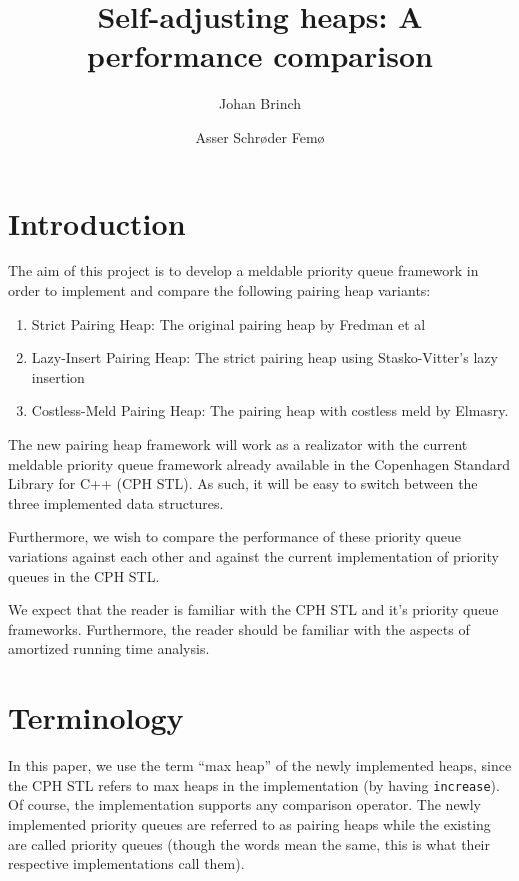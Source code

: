 \documentclass{DIKU-article}[2010/01/13]
\title{Self-adjusting heaps: A performance comparison}
\author{
Johan Brinch
\and
Asser Schrøder Femø
}
\institute{
Department of Computing, University of Copenhagen\\
Universitetsparken 1, DK-2100 Copenhagen East, Denmark\\
\email{zerrez@diku.dk}
\and
\email{asser@diku.dk}
}
\newcommand{\code}[1]{{\small\texttt{#1}}}
\begin{document}
\maketitle

\begin{abstract}
\end{abstract}

\begin{subject}
\end{subject}

\section{Introduction}

The aim of this project is to develop a meldable priority queue
framework in order to implement and compare the following pairing heap
variants:

\begin{enumerate}
\item Strict Pairing Heap: The original pairing heap by Fredman et
  al\cite{fredman}
\item Lazy-Insert Pairing Heap: The strict pairing heap using
  Stasko-Vitter's lazy insertion\cite{stasky}
\item Costless-Meld Pairing Heap: The pairing heap with costless meld
  by Elmasry\cite{elmasry}.
\end{enumerate}

The new pairing heap framework will work as a realizator with the
current meldable priority queue framework already available in the
Copenhagen Standard Library for C++ (CPH STL). As such, it will be
easy to switch between the three implemented data structures.

Furthermore, we wish to compare the performance of these priority
queue variations against each other and against the current
implementation of priority queues in the CPH STL.

We expect that the reader is familiar with the CPH STL and it's
priority queue frameworks\cite{cphstl-framework}. Furthermore, the
reader should be familiar with the aspects of amortized running time
analysis.



\section{Terminology}
In this paper, we use the term "`max heap"' of the newly implemented
heaps, since the CPH STL refers to max heaps in the implementation (by
having \code{increase}). Of course, the implementation supports any
comparison operator. The newly implemented priority queues are
referred to as pairing heaps while the existing are called priority
queues (though the words mean the same, this is what their respective
implementations call them).
\end{document}
